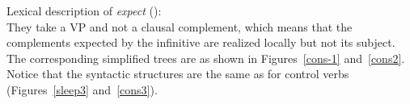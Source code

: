 \eas
Lexical description of \emph{expect} ():\\
\zs
They take a VP and not a clausal complement, which means that the complements expected by the
infinitive are realized locally but not its subject. The  corresponding simplified trees are as
shown in Figures~\ref{cons-1} and~\ref{cons2}. Notice that the syntactic structures are the same as for control verbs (Figures~\ref{sleep3} and~\ref{cons3}). 
